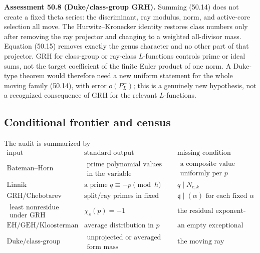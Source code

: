 \documentclass[10pt,reqno]{amsart}
\theoremstyle{definition}
\newcommand{\1}{\mathbf 1}
\begin{document}
\medskip\noindent\textbf{Assessment 50.8 (Duke/class-group GRH).}
Summing (50.14) does not create a fixed theta series: the discriminant,
ray modulus, norm, and active-core selection all move.  The
Hurwitz--Kronecker identity restores class numbers only after removing the
ray projector and changing to a weighted all-divisor mass.  Equation
(50.15) removes exactly the genus character and no other part of that
projector.  GRH for class-group or ray-class $L$-functions controls prime
or ideal sums, not the target coefficient of the finite Euler product of
one norm.  A Duke-type theorem would therefore need a new uniform
statement for the whole moving family (50.14), with error $o(P_L^-)$; this
is a genuinely new hypothesis, not a recognized consequence of GRH for the
relevant $L$-functions.

\subsection{Conditional frontier and census}
The audit is summarized by
\begingroup
\scriptsize
\begin{equation}\tag{50.17}
\begin{array}{c|c|c}
\text{input}&\text{standard output}&\text{missing condition}\\ \hline
\text{Bateman--Horn}&
 \begin{gathered}\text{prime polynomial values on average}\\
                 \text{in the variable}\end{gathered}
 &\begin{gathered}\text{a composite value with a good factor,}\\
                   \text{uniformly per }p\end{gathered}\\
\text{Linnik}&\text{a prime }q\equiv-p\pmod h&q\mid N_{c,k}\\
\text{GRH/Chebotarev}&\text{split/ray primes in fixed fields}
 &\mathfrak q\mid(\alpha)\text{ for each fixed }\alpha\\
\begin{gathered}\text{least nonresidue}\\\text{under GRH}\end{gathered}
 &\chi_s(p)=-1&\text{the residual exponent-box hit}\\
\text{EH/GEH/Kloosterman}&\text{average distribution in }p
 &\text{an empty exceptional set}\\
\text{Duke/class-group GRH}&
 \begin{gathered}\text{unprojected or averaged}\\
                 \text{form mass}\end{gathered}
 &\text{the moving ray projector}
\end{array}
\end{equation}
\end{document}
